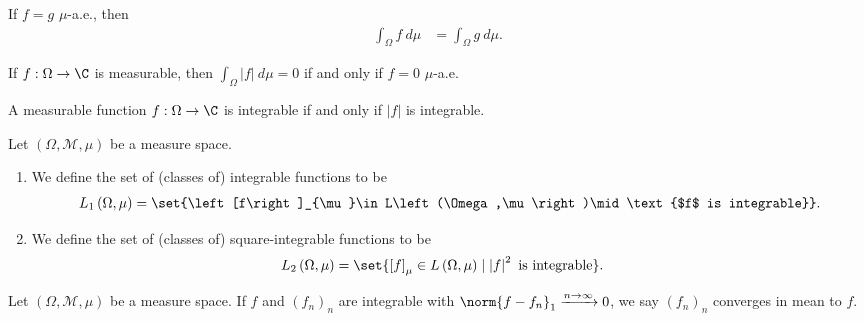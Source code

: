 \begin{fact}
  If $f = g$ $\mu$-a.e., then
  \begin{align*}
    \int_{\Omega}^{} f\:d\mu &= \int_{\Omega}^{} g\:d\mu.
  \end{align*}
\end{fact}
\begin{fact}
  If $f: \Omega\rightarrow \C$ is measurable, then $\int_{\Omega}^{} \left\vert f \right\vert\:d\mu = 0$ if and only if $f = 0$ $\mu$-a.e.
\end{fact}
\begin{fact}
  A measurable function $f: \Omega\rightarrow \C$ is integrable if and only if $\left\vert f \right\vert$ is integrable.
\end{fact}
\begin{definition}
  Let $\left(\Omega,\mathcal{M},\mu\right)$ be a measure space.
  \begin{enumerate}[(1)]
    \item We define the set of (classes of) integrable functions to be
      \begin{align*}
        L_{1}\left(\Omega,\mu\right) = \set{\left[f\right]_{\mu}\in L\left(\Omega,\mu\right)\mid \text{$f$ is integrable}}.
      \end{align*}
    \item We define the set of (classes of) square-integrable functions to be
      \begin{align*}
        L_{2}\left(\Omega,\mu\right) &= \set{\left[f\right]_{\mu}\in L\left(\Omega,\mu\right)\mid \left\vert f \right\vert^2\text{ is integrable}}.
      \end{align*}
  \end{enumerate}
\end{definition}
\begin{definition}
  Let $\left(\Omega,\mathcal{M},\mu\right)$ be a measure space. If $f$ and $\left(f_n\right)_n$ are integrable with $\norm{f-f_n}_{1}\xrightarrow{n\rightarrow\infty}0$, we say $\left(f_n\right)_n$ converges in mean to $f$.
\end{definition}

